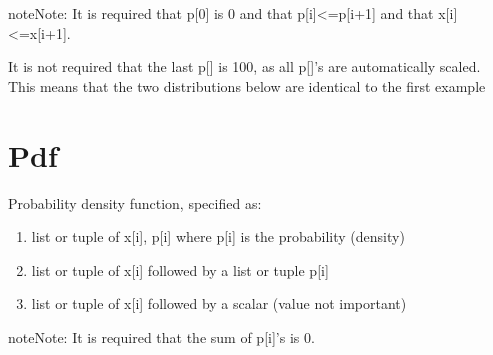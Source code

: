 \documentclass[letterpaper,10pt,english]{sphinxmanual}
\begin{document}
\begin{sphinxadmonition}{note}{Note:}
It is required that p{[}0{]} is 0 and that p{[}i{]}\textless{}=p{[}i+1{]} and that x{[}i{]}\textless{}=x{[}i+1{]}.
\end{sphinxadmonition}

It is not required that the last p{[}{]} is 100, as all p{[}{]}’s are automatically scaled. This means that the two distributions below are
identical to the first example

\begin{sphinxVerbatim}[commandchars=\\\{\}]
           
                      
\end{sphinxVerbatim}


\section{Pdf}
\label{\detokenize{Distributions:pdf}}
Probability density function, specified as:
\begin{enumerate}
\item {} 
list or tuple of x{[}i{]}, p{[}i{]} where p{[}i{]} is the probability (density)

\item {} 
list or tuple of x{[}i{]} followed by a list or tuple p{[}i{]}

\item {} 
list or tuple of x{[}i{]} followed by a scalar (value not important)

\end{enumerate}

\begin{sphinxadmonition}{note}{Note:}
It is required that the sum of p{[}i{]}’s is  0.
\end{sphinxadmonition}
\end{document}
